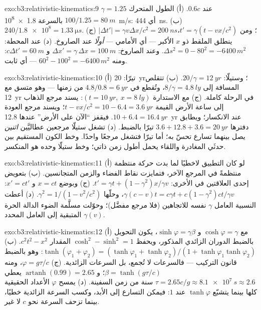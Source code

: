 \begin{solution}{exo:b3:relativistic-kinematics:9}
$\gamma = 1.25$ عند $0.6c$. (أ) الطول المتحرك $100/1.25 = \qty{80}{m}$
بالسرعة \qty{1.8e8}{m/s}: أي \qty{444}{ns}. (ب) $240/\num{1.8e8} =
\qty{1.33}{\micro s}$. (ج) $|\Delta t'| = \gamma v\Delta x/c^2 =
\qty{200}{ns}$؛ ومن $t' = \gamma(t - vx/c^2)$، ينطلق الملقط ذو
$x$ الأكبر --- أي الأمامي --- \emph{أولًا} عند الصاروخ. (د)
عند المحطة: $\Delta s^2 = 0 - 80^2 = -6400\,\unit{m^2}$. وعند الصاروخ: $\Delta
x' = \gamma\,\Delta x = \qty{100}{m}$ و $c\Delta t' = \qty{60}{m}$:
ومنه $60^2 - 100^2 = -6400\,\unit{m^2}$ --- أي ثابت.
\end{solution}

\begin{solution}{exo:b3:relativistic-kinematics:10}
(أ) تيرّا: \qty{20}{yr}؛ وستيلّا: $20/\gamma = \qty{12}{yr}$. (ب)
تتقلص المسافة إلى $8/\gamma = \qty{4.8}{ly}$، وتُقطع في $4.8/0.8
= \qty{6}{yr}$ من زمنها --- وهو متسق مع \qty{12}{yr} في
الرحلة كاملة. (ج)  مع  الاستدارة $(t =
\qty{10}{yr},\ x = \qty{8}{ly})$: يسند مرجع الذهاب إلى ساعة
الأرض القيمة $t - vx/c^2 = 10 - 6.4 = \qty{3.6}{yr}$؛ ويسند مرجع العودة $10 +
6.4 = \qty{16.4}{yr}$. فيقفز ``الآن على الأرض'' عندها \qty{12.8}{yr}
عند الانكسار؛ ويطابق دفترها $3.6 + 12.8 + 3.6 = \qty{20}{yr}$
تيرّا بالضبط. (د) تشغل ستيلّا مرجعين عطاليَّين \emph{اثنين} يصل
بينهما تسارع تحسّ به؛ أما تيرّا فتشغل مرجعًا واحدًا. وخط الكون
المستقيم بين حدثَي المغادرة واللقاء يحمل أطول
زمن ذاتي؛ وخط ستيلّا وحده هو المنكسر.
\end{solution}

\begin{solution}{exo:b3:relativistic-kinematics:11}
(أ) لو كان التطبيق لاخطيًا لما بدت حركة منتظمة منتظمةً
في المرجع الآخر، فتمايزت نقاط الفضاء والزمن المتجانسين.
(ب) بتعويض إحدى العلاقتين في الأخرى: $t' = \gamma t +
(1 - \gamma^2)x/\gamma v$. (ج) وبوضع $x = ct$ و $x' = ct'$:
$\gamma(c - v)t = c\gamma t + c(1 - \gamma^2)ct/\gamma v$، وحلّها
$\gamma^2 = 1/(1 - v^2/c^2)$. (د) أعطت النسبية العامل
$\gamma$ نفسه للاتجاهين (فلا مرجع مفضَّل)؛ وحوّلت مسلَّمة
الضوء الدالة الحرة المتبقية إلى العامل المحدد
$\gamma(v)$.
\end{solution}

\begin{solution}{exo:b3:relativistic-kinematics:12}
(أ) مع $\cosh\varphi = \gamma$ و $\sinh\varphi = \gamma\beta$، يكون
التحويل بالضبط الدوران الزائدي المذكور، ويحفظ
$\cosh^2 - \sinh^2 = 1$ المقدار $c^2t^2 - x^2$. (ب)
$\tanh(\varphi_1 + \varphi_2) = (\tanh\varphi_1 + \tanh\varphi_2)/(1 +
\tanh\varphi_1\tanh\varphi_2)$: وهو بالضبط قانون التركيب ---
فالسرعات لا تُجمع، بل السرعات الزائدية. (ج) $\varphi = g\tau/c$، ومنه
$\beta = \tanh(g\tau/c)$؛ و $\operatorname{artanh}(0.99) = 2.65$ يعطي
$\tau = 2.65c/g \approx \qty{8.1e7}{s} \approx 2.6$ سنة من زمن
السفينة. (د) يمسح $\varphi$ الأعداد الحقيقية كلها بينما يتشبّع
$\tanh\varphi$ عند $1$: فيمكن التسارع إلى الأبد، وكسب السرعة
الزائدية خطيًا، بينما تزحف السرعة نحو $c$ لا غير.
\end{solution}

